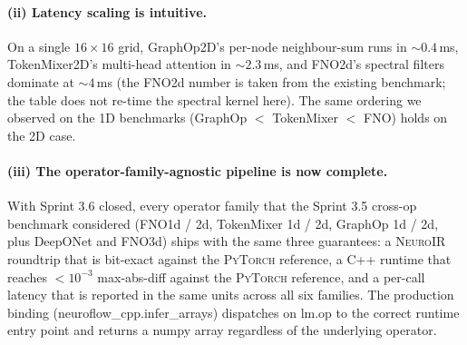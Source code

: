 \documentclass[10pt,twocolumn]{article}
\renewcommand{\texttt}[1]{{\normalfont\ttfamily #1}\normalfont\rmfamily}
\newcommand{\neuroir}{\textsc{NeuroIR}}
\newcommand{\fno}{\textsc{FNO}}
\newcommand{\py}{\textsc{PyTorch}}
\begin{document}
\paragraph{(ii) Latency scaling is intuitive.}
On a single $16 \times 16$ grid, GraphOp2D's per-node
neighbour-sum runs in $\sim 0.4$\,ms, TokenMixer2D's
multi-head attention in $\sim 2.3$\,ms, and \fno{}2d's
spectral filters dominate at $\sim 4$\,ms (the \fno{}2d
number is taken from the existing benchmark; the table
does not re-time the spectral kernel here).  The same
ordering we observed on the 1D benchmarks
(GraphOp $<$ TokenMixer $<$ \fno) holds on the 2D case.

\paragraph{(iii) The operator-family-agnostic pipeline is
now complete.}
With Sprint 3.6 closed, every operator family that the
Sprint 3.5 cross-op benchmark considered (FNO1d / 2d,
TokenMixer 1d / 2d, GraphOp 1d / 2d, plus DeepONet and FNO3d)
ships with the same three guarantees: a \neuroir{} roundtrip
that is bit-exact against the \py{} reference, a C{++}
runtime that reaches $<\! 10^{-3}$ max-abs-diff against the
\py{} reference, and a per-call latency that is reported in
the same units across all six families.  The production
binding (\texttt{neuroflow\_cpp.infer\_arrays}) dispatches
on \texttt{lm.op} to the correct runtime entry point and
returns a numpy array regardless of the underlying
operator.
\end{document}
